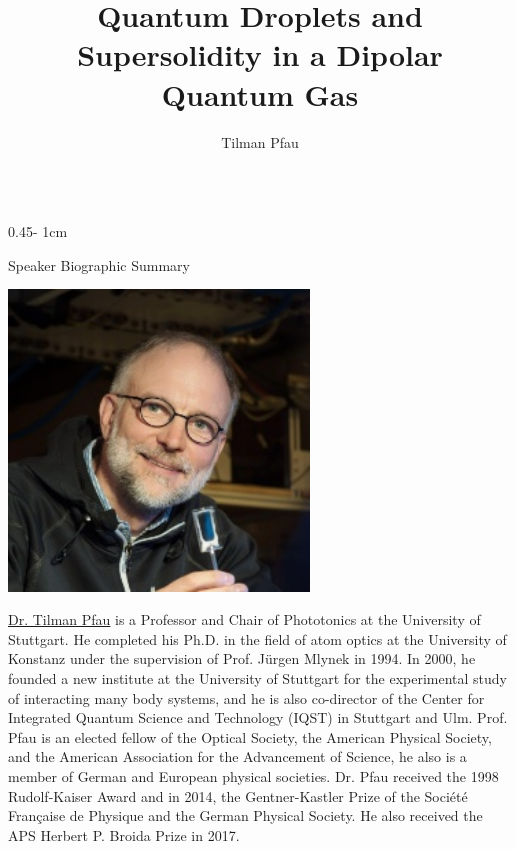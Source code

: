 \documentclass{../psuposter}
\title{Quantum Droplets and Supersolidity in a Dipolar Quantum Gas}
\author{Tilman Pfau}
\institute{University of Stuttgart}
\begin{document}
\begin{frame}
\begin{columns}[t, totalwidth=\textwidth]
\begin{column}{0.45\textwidth - 1cm}


    \begin{block}{Speaker Biographic Summary}
    	\begin{center}
    		\includegraphics[width=0.6\textwidth]{images/pfau}
    	\end{center}
    	\href{https://www.uni-stuttgart.de/en/press/experts/Prof.-Tilman-Pfau/}{Dr. Tilman Pfau} is a Professor and Chair of Phototonics at the University of Stuttgart. 
    	He completed his Ph.D. in the field of atom optics at the University of Konstanz under the supervision of Prof. Jürgen Mlynek in 1994. 
    	In 2000, he founded a new institute at the University of Stuttgart for the experimental study of interacting many body systems, and he is also co-director of the Center for Integrated Quantum Science and Technology (IQST) in Stuttgart and Ulm. 
    	Prof. Pfau is an elected fellow of the Optical Society, the American Physical Society, and the American Association for the Advancement of Science, he also is a member of German and European physical societies. Dr. Pfau received the 1998 Rudolf-Kaiser Award and in 2014, the Gentner-Kastler Prize of the Société Française de Physique and the German Physical Society. He also received the APS Herbert P. Broida Prize in 2017.
    \end{block}



\end{column}
\end{columns}
\end{frame}
\end{document}

